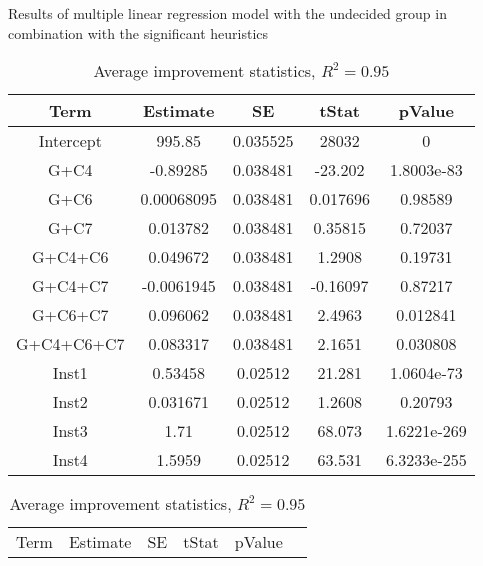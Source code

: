 \documentclass[../main.tex]{subfiles}
\begin{document}
\begin{table}
    \centering
    \caption{Results of multiple linear regression model with the undecided group in combination with the significant heuristics}
    \begin{adjustbox}{width=\columnwidth,center}
        \begin{subtable}{.95\columnwidth}
            \centering
            \begin{tabular}{ccccc}
            \hline
            Term    &Estimate   & SE    & tStat & pValue \\ 
            \hline                
        Intercept       & 995.85    & 0.035525      & 28032     & 0         \\
            G+C4        & -0.89285  & 0.038481      & -23.202   & 1.8003e-83\\
            G+C6        & 0.00068095& 0.038481      & 0.017696  & 0.98589   \\
            G+C7        & 0.013782  & 0.038481      & 0.35815   & 0.72037   \\
            G+C4+C6     & 0.049672  & 0.038481      & 1.2908    & 0.19731   \\
            G+C4+C7     & -0.0061945& 0.038481      & -0.16097  & 0.87217   \\
            G+C6+C7     & 0.096062  & 0.038481      & 2.4963    & 0.012841  \\
            G+C4+C6+C7  & 0.083317  & 0.038481      & 2.1651    & 0.030808  \\
            Inst1       & 0.53458   & 0.02512       & 21.281    & 1.0604e-73\\
            Inst2       & 0.031671  & 0.02512       & 1.2608    & 0.20793   \\
            Inst3       & 1.71      & 0.02512       & 68.073    &1.6221e-269\\
            Inst4       & 1.5959    & 0.02512       & 63.531    &6.3233e-255\\
            \hline
            \end{tabular}
        \caption{Average improvement statistics, $R^2=0.95$}
        \label{tab:regrAvrgGroup}
        \end{subtable}
        \hfill
        \begin{subtable}{.75\columnwidth}
            \centering
            \begin{tabular}{cccccc}
            \hline
            Term    &Estimate   & SE    & tStat & pValue \\ 

\end{tabular}
\end{subtable}
\end{adjustbox}
\end{table}
\end{document}
